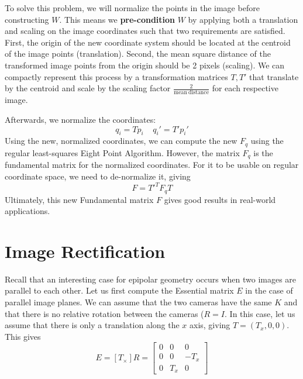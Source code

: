 \documentclass[a4paper, 12pt]{article}
\renewcommand\emph{\textbf}
\begin{document}
To solve this problem, we will normalize the points in the image before constructing $W$. This means we \emph{pre-condition} $W$ by applying both a translation and scaling on the image coordinates such that two requirements are satisfied. First, the origin of the new coordinate system should be located at the centroid of the image points (translation). Second, the mean square distance of the transformed image points from the origin should be 2 pixels (scaling). We can compactly represent this process by a transformation matrices $T, T'$ that translate by the centroid and scale by the scaling factor $\frac{2}{\mathrm{mean\ distance}}$ for each respective image.

Afterwards, we normalize the coordinates:
\begin{equation}
q_i = Tp_i \ \ \ \ \ q_i' = T'p_i'
\end{equation}
Using the new, normalized coordinates, we can compute the new $F_q$ using the regular least-squares Eight Point Algorithm. However, the matrix $F_q$ is the fundamental matrix for the normalized coordinates. For it to be usable on regular coordinate space, we need to de-normalize it, giving
\begin{equation}
F = T'^TF_qT
\end{equation}
Ultimately, this new Fundamental matrix $F$ gives good results in real-world applications.

\section{Image Rectification}

Recall that an interesting case for epipolar geometry occurs when two images are parallel to each other. Let us first compute the Essential matrix $E$ in the case of parallel image planes. We can assume that the two cameras have the same $K$ and that there is no relative rotation between the cameras ($R= I$. In this case, let us assume that there is only a translation along the $x$ axis, giving $T = (T_x, 0, 0)$. This gives
\begin{equation}
E = [T_\times] R = \begin{bmatrix} 0 & 0 & 0\\ 0 & 0 & -T_x \\ 0 & T_x  & 0 \end{bmatrix}
\end{equation}
\end{document}
